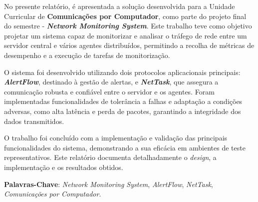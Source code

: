 \documentclass[a4paper,12pt]{scrreprt}
\begin{document}




\makecover





\renewenvironment{abstract}
 {\par\noindent\textbf{\Large\abstractname}\par\bigskip}
 {}

\begin{flushleft}
\begin{abstract}
    \par
    No presente relatório, é apresentada a solução desenvolvida para a Unidade Curricular
    de \textbf{Comunicações por Computador}, como parte do projeto final do semestre - \textbf{\textit{Network Monitoring System}}.
    Este trabalho teve como objetivo projetar um sistema capaz de monitorizar e analisar o tráfego de rede entre um servidor
    central e vários agentes distribuídos, permitindo a recolha de métricas de desempenho e a execução de tarefas de monitorização.

    O sistema foi desenvolvido utilizando dois protocolos aplicacionais principais: \textbf{\textit{AlertFlow}}, destinado à gestão de alertas,
    e \textbf{\textit{NetTask}}, que assegura a comunicação robusta e confiável entre o servidor e os agentes. Foram implementadas funcionalidades
    de tolerância a falhas e adaptação a condições adversas, como alta latência e perda de pacotes, garantindo a integridade dos dados transmitidos.

    O trabalho foi concluído com a implementação e validação das principais funcionalidades do sistema, demonstrando a sua eficácia em ambientes
    de teste representativos. Este relatório documenta detalhadamente o \textit{design}, a implementação e os resultados obtidos.

    \par \textbf{Palavras-Chave}: \textit{Network Monitoring System}, \textit{AlertFlow}, \textit{NetTask}, \textit{Comunicações por Computador}.
\end{abstract}
\end{flushleft}
\end{document}
